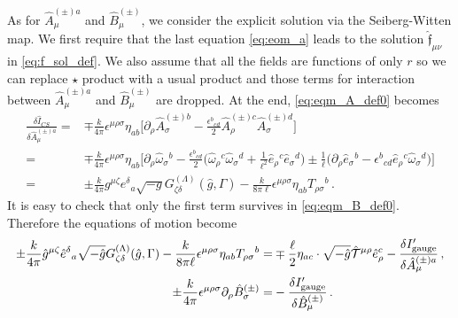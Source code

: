 \documentclass[11pt]{article}
\newcommand{\nn}{\nonumber}
\numberwithin{equation}{section}
\begin{document}
As for $\hat{A}_\mu^{(\pm)a}$ and $\hat{B}_\mu^{(\pm)}$, we consider the explicit solution via the Seiberg-Witten map.
We first require that the last equation \eqref{eq:eom_a} leads to the solution
$\hat{\mathfrak{f}}_{\mu\nu}$ in \eqref{eq:f_sol_def}.
We also assume that all the fields are functions of only $r$ so we can replace $\star$ product with a usual product and those terms for interaction between $\hat{A}_\mu^{(\pm)a}$
and $\hat{B}_\mu^{(\pm)}$ are dropped.
At the end, \eqref{eq:eqm_A_def0} becomes
\begin{align}
    \frac{\delta \hat{I}_{CS}}{\delta \hat{A}_\mu^{(\pm)a}} =&
\mp \frac{k}{4\pi} \epsilon^{\mu\rho\sigma} \eta_{ab}
\bigg[ \partial_\rho \hat{A}_\sigma^{(\pm)b} - \frac{\epsilon^b{}_{cd}}{2} \hat{A}_\rho^{(\pm)c} \hat{A}_\sigma^{(\pm)d} \bigg]
\nn\\=&
\mp \frac{k}{4\pi} \epsilon^{\mu\rho\sigma} \eta_{ab}
\bigg[
\partial_\rho \hat\omega_\sigma{}^b
-\frac{\epsilon^b{}_{cd}}{2}\bigg( \hat\omega_\rho{}^c \hat\omega_\sigma{}^d + \frac{1}{\ell^2}\hat{e}_\rho{}^c \hat{e}_\sigma{}^d \bigg)
\pm \frac{1}{\ell} \big(\partial_\rho \hat{e}_\sigma{}^b - \epsilon^b{}_{cd} \hat{e}_\rho{}^c \hat\omega_\sigma{}^d \big) \bigg]
\nn\\=&
\pm \frac{k}{4\pi} g^{\mu\zeta} e^\delta{}_a \sqrt{-g} G^{(\Lambda)}_{\zeta\delta}(\hat{g},\Gamma)
- \frac{k}{8\pi \ell} \epsilon^{\mu\rho\sigma} \eta_{ab} T_{\rho\sigma}{}^b
\,.
\end{align}
It is easy to check that only the first term survives in \eqref{eq:eqm_B_def0}.
Therefore the equations of motion become
\begin{align}
  \pm \frac{k}{4\pi} \hat{g}^{\mu\zeta} \hat{e}^\delta{}_a \sqrt{-\hat{g}} 
G^{(\Lambda)}_{\zeta\delta}(\hat{g},\Gamma)
- \frac{k}{8\pi \ell} \epsilon^{\mu\rho\sigma} \eta_{ab} T_{\rho\sigma}{}^b =&
\mp \frac{\ell}{2} \eta_{ac} \cdot \sqrt{-\hat{g}} \hat{{\cal T}}^{\mu\rho} \hat{e}_\rho^c
-\frac{\delta I'_\text{gauge}}{\delta \hat{A}_\mu^{(\pm)a}} \,,\\
\pm \frac{k}{4\pi} \epsilon^{\mu\rho\sigma} 
\partial_\rho \hat{B}_\sigma^{(\pm)}
=& - \frac{\delta {I}'_\text{gauge}}{\delta \hat{B}_\mu^{(\pm)}} \,.
\end{align}
\end{document}
